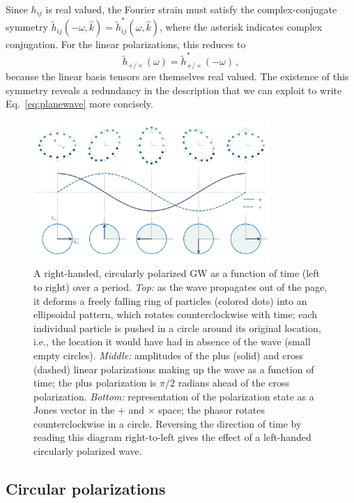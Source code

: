 \documentclass[aps,prd,twocolumn,superscriptaddress,preprintnumbers,floatfix,nofootinbib]{revtex4-2}
\newcommand{\beq}{\begin{equation}}
\newcommand{\eeq}{\end{equation}}
\begin{document}
Since $h_{ij}$ is real valued, the Fourier strain must  satisfy the complex-conjugate symmetry $\tilde{h}_{ij}(-\omega, \hat{k}) = \tilde{h}_{ij}^*(\omega,\hat{k})$, where the asterisk indicates complex conjugation.
For the linear polarizations, this reduces to
\beq \label{eq:sym_linear}
\tilde{h}_{+/\times}(\omega) = \tilde{h}_{+/\times}^*(-\omega)\, ,
\eeq
because the linear basis tensors are themselves real valued.
The existence of this symmetry reveals a redundancy in the description that we can exploit to write Eq.~\eqref{eq:planewave} more concisely.

\begin{figure}
\includegraphics[width=0.8\textwidth]{pol_diagram_circ}
\caption{A right-handed, circularly polarized GW as a function of time (left to right) over a period. \emph{Top:} as the wave propagates out of the page, it deforms a freely falling ring of particles (colored dots) into an ellipsoidal pattern, which rotates counterclockwise with time; each individual particle is pushed in a circle around its original location, i.e., the location it would have had in absence of the wave (small empty circles).
\emph{Middle:} amplitudes of the plus (solid) and cross (dashed) linear polarizations making up the wave as a function of time; the plus polarization is $\pi/2$ radians ahead of the cross polarization.
\emph{Bottom:} representation of the polarization state as a Jones vector in the $+$ and $\times$ space; the phasor rotates counterclockwise in a circle.
Reversing the direction of time by reading this diagram right-to-left gives the effect of a left-handed circularly polarized wave.
}
\label{fig:pol_diagram_circ}
\end{figure}

\subsection{Circular polarizations}
\end{document}
